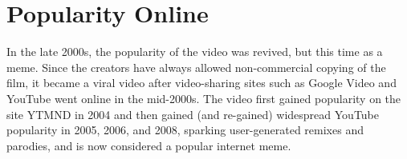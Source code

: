 
\chapter{Popularity Online}
\label{popularity_online}In the late 2000s, the popularity of the video was revived, but this time as a meme. Since the creators have always allowed non-commercial copying of the film, it became a viral video after video-sharing sites such as Google Video and YouTube went online in the mid-2000s. The video first gained popularity on the site YTMND in 2004 and then gained (and re-gained) widespread YouTube popularity in 2005, 2006, and 2008, sparking user-generated remixes and parodies, and is now considered a popular internet meme.